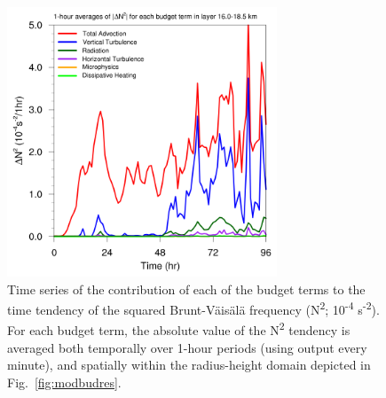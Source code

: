 \documentclass{ametsoc}
\begin{document}
\begin{figure}[ht]
\centerline{\includegraphics[width=19pc]{figures/fig04_AVG_budterms.png}}
\caption{Time series of the contribution of each of the budget terms to the time tendency of the squared Brunt-V{\"a}is{\"a}l{\"a} frequency (N\textsuperscript{2}; 10\textsuperscript{-4} s\textsuperscript{-2}). For each budget term, the absolute value of the N\textsuperscript{2} tendency is averaged both temporally over 1-hour periods (using output every minute), and spatially within the radius-height domain depicted in Fig.~\ref{fig:modbudres}.}
\label{fig:avgbudterms}
\end{figure}

\end{document}
